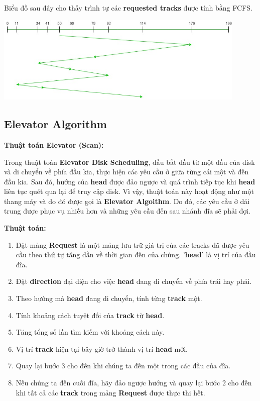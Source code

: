 \documentclass{report}
\begin{document}
    Biểu đồ sau đây cho thấy trình tự các \textbf{requested tracks} được tính bằng FCFS. 

    \includegraphics[width = 12cm]{images/fcfs/fcfs-1.jpg}

    
        
    \subsection{Elevator Algorithm}

    \textbf{Thuật toán Elevator (Scan):}
    
    Trong thuật toán \textbf{Elevator Disk Scheduling}, đầu bắt đầu từ một đầu của disk và di chuyển về phía đầu kia, thực hiện các yêu cầu ở giữa từng cái một và đến đầu kia. Sau đó, hướng của \textbf{head} được đảo ngược và quá trình tiếp tục khi \textbf{head} liên tục quét qua lại để truy cập disk. Vì vậy, thuật toán này hoạt động như một thang máy và do đó được gọi là \textbf{Elevator Algoithm}. Do đó, các yêu cầu ở dải trung được phục vụ nhiều hơn và những yêu cầu đến sau nhánh đĩa sẽ phải đợi.

    \textbf{Thuật toán:} 

    \begin{enumerate}
        \item 
            Đặt mảng \textbf{Request} là một mảng lưu trữ giá trị của các tracks đã được yêu cầu theo thứ tự tăng dần về thời gian đến của chúng. '\textbf{head}' là vị trí của đầu đĩa.
        \item 
            Đặt \textbf{direction} đại diện cho việc \textbf{head} đang di chuyển về phía trái hay phải.
        \item 
            Theo hướng mà \textbf{head} đang di chuyển, tính từng \textbf{track} một.
        \item 
            Tính khoảng cách tuyệt đối của \textbf{track} từ \textbf{head}.
        \item 
            Tăng tổng số lần tìm kiếm với khoảng cách này.
        \item 
            Vị trí \textbf{track} hiện tại bây giờ trở thành vị trí \textbf{head} mới.
        \item 
            Quay lại bước 3 cho đến khi chúng ta đến một trong các đầu của đĩa.
        \item  
            Nếu chúng ta đến cuối đĩa, hãy đảo ngược hướng và quay lại bước 2 cho đến khi tất cả các \textbf{track} trong mảng \textbf{Request} được thực thi hết.
            
    \end{enumerate}
\end{document}
